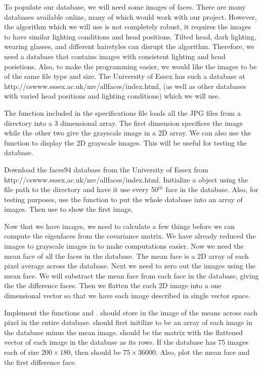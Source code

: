 To populate our database, we will need some images of faces.
There are many databases available online, many of which would work with our project.
However, the algorithm which we will use is not completely robust, it requires the images to have similar lighting conditions and head positions.
Tilted head, dark lighting, wearing glasses, and different hairstyles can disrupt the algorithm.
Therefore, we need a database that contains images with consistent lighting and head posistions.
Also, to make the programming easier, we would like the images to be of the same file type and size.
The University of Essex has such a database at http://cswww.essex.ac.uk/mv/allfaces/index.html, (as well as other databases with varied head positions and lighting conditions) which we will use.

The function  included in the specifications file loads all the JPG files from a directory into a 3 dimensional array.
The first dimension specifices the image while the other two give the grayscale image in a 2D array.
We can also use the function  to display the 2D grayscale images.
This will be useful for testing the database.

\begin{problem}
Download the faces94 database from the University of Essex from http://cswww.essex.ac.uk/mv/allfaces/index.html.
Initialize a  object using the file path to the directory and have it use every 50$^{th}$ face in the database.
Also, for testing purposes, use the function  to put the whole database into an array of images.
Then use  to show the first image.
\end{problem}

Now that we have images, we need to calculate a few things before we can compute the eigenfaces from the covariance matrix.
We have already reduced the images to grayscale images in  to make computations easier.
Now we need the mean face of all the faces in the database. The mean face is a 2D array of each pixel average across the database.
Next we need to zero out the images using the mean face.
We will substract the mean face from each face in the database, giving the the difference faces.
Then we flatten the each 2D image into a one dimensional vector so that we have each image described in single vector space.

\begin{problem}
Implement the functions  and .
 should store in  the image of the means across each pixel in the entire database.
 should first initilize  to be an array of each image in the database minus the mean image.
 should be the matrix with the flattened vector of each image in the database as its rows.
If the database has 75 images each of size $200 \times 180$, then  should be $75 \times 36000$.
Also, plot the mean face and the first difference face.
\end{problem}

